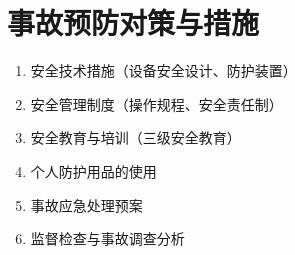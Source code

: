 \section{事故预防对策与措施}

\begin{enumerate}[leftmargin=*]
    \item 安全技术措施（设备安全设计、防护装置）
    \item 安全管理制度（操作规程、安全责任制）
    \item 安全教育与培训（三级安全教育）
    \item 个人防护用品的使用
    \item 事故应急处理预案
    \item 监督检查与事故调查分析
\end{enumerate}

\newpage

\newpage